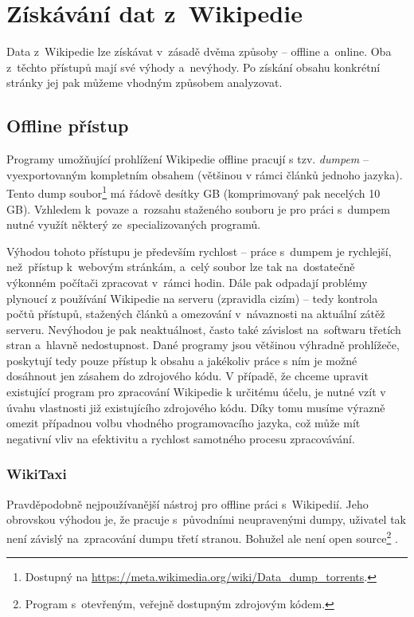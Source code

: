  
 
\section{Získávání dat z~Wikipedie}
Data z~Wikipedie lze získávat v~zásadě dvěma způsoby -- offline a~online. Oba z~těchto přístupů mají své výhody a~nevýhody. Po získání obsahu konkrétní stránky jej pak můžeme vhodným způsobem analyzovat.

\subsection{Offline přístup}
Programy umožňující prohlížení Wikipedie offline pracují s tzv. \textit{dumpem} -- vyexportovaným kompletním obsahem (většinou v rámci článků jednoho jazyka). Tento dump soubor\footnote{Dostupný na \url{https://meta.wikimedia.org/wiki/Data_dump_torrents}.} má řádově desítky GB (komprimovaný pak necelých 10 GB). Vzhledem k~povaze a~rozsahu staženého souboru je pro práci s~dumpem nutné využít některý ze~specializovaných programů.

Výhodou tohoto přístupu je především rychlost -- práce s~dumpem je rychlejší, než~přístup k~webovým stránkám, a~celý soubor lze tak na~dostatečně výkonném počítači zpracovat v~rámci hodin. Dále pak odpadají problémy plynoucí z používání Wikipedie na serveru (zpravidla cizím) -- tedy kontrola počtů přístupů, stažených článků a omezování v~návaznosti na aktuální zátěž serveru. Nevýhodou je pak neaktuálnost, často také závislost na~softwaru třetích stran a~hlavně nedostupnost. Dané programy jsou většinou výhradně prohlížeče, poskytují tedy pouze přístup k obsahu a jakékoliv práce s ním je možné dosáhnout jen zásahem do zdrojového kódu. V případě, že chceme upravit existující program pro zpracování Wikipedie k určitému účelu, je nutné vzít v úvahu vlastnosti již existujícího zdrojového kódu. Díky tomu musíme výrazně omezit případnou volbu vhodného programovacího jazyka, což může mít negativní vliv na efektivitu a rychlost samotného procesu zpracovávání.
\subsubsection{WikiTaxi}
Pravděpodobně nejpoužívanější nástroj pro offline práci s~Wikipedií. Jeho obrovskou výhodou je, že pracuje s~původními neupravenými dumpy, uživatel tak není závislý na~zpracování dumpu třetí stranou. Bohužel ale není open source\footnote{Program s~otevřeným, veřejně dostupným zdrojovým kódem.} \cite{wikitaxi}.
